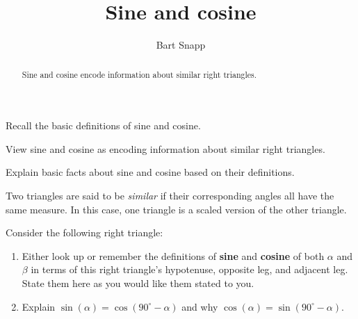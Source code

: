 \documentclass[noauthor,nooutcomes,hints,handout]{ximera}
\title{Sine and cosine}
\author{Bart Snapp}
\begin{document}
\begin{abstract}
  Sine and cosine encode information about similar right triangles.
\end{abstract}
\maketitle

\begin{listOutcomes}
\item Recall the basic definitions of sine and cosine.
\item View sine and cosine as encoding information about similar right
  triangles.
\item Explain basic facts about sine and cosine based on their
  definitions.
\end{listOutcomes}
\mynewpage



\begin{definition}
 Two triangles are said to be \emph{similar} if their corresponding angles all have the same measure.  In this case, one triangle is a scaled version of the other triangle.
\end{definition}


\begin{question}
  Consider the following right triangle:
  \begin{center}
    \end{center}
  \begin{enumerate}
  \item Either look up or remember the definitions of \textbf{sine}
    and \textbf{cosine} of both $\alpha$ and $\beta$ in terms of this
    right triangle's hypotenuse, opposite leg, and adjacent leg. State them here as you would like them stated to you.  
    \item Explain $\sin(\alpha) =
    \cos(90^\circ-\alpha)$ and why $\cos(\alpha) =
    \sin(90^\circ-\alpha)$.
\end{enumerate}
\end{question}
\mynewpage
\end{document}
